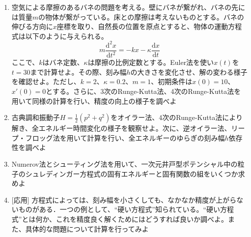 \documentclass[11pt]{jarticle}
\begin{document}
\noindent {\bf [常微分方程式]}
\begin{enumerate}

\renewcommand{\labelenumi}{2-\arabic{enumi})}
\item 空気による摩擦のあるバネの問題を考える。壁にバネが繋がれ、バネの先には質量$m$の物体が繋がっている。床との摩擦は考えないものとする。バネの伸びる方向に$x$座標を取り、自然長の位置を原点とすると、物体の運動方程式は以下のように与えられる。
  \[
  m\frac{\mathrm{d} ^2x}{\mathrm{d} t^2} = -kx - \kappa \frac{\mathrm{d} x}{\mathrm{d} t} 
  \]
  ここで、$k$はバネ定数、$\kappa$は摩擦の比例定数とする。Euler法を使い$x(t)$を$t=30$まで計算せよ。その際、刻み幅$h$の大きさを変化させ、解の変わる様子を確認せよ。ただし、$k=2$、$\kappa = 0.2$、$m = 1$、初期条件は$x(0) = 10$、$x'(0) = 0$とする。さらに、3次のRunge-Kutta法、4次のRunge-Kutta法を用いて同様の計算を行い、精度の向上の様子を調べよ

\item 古典調和振動子$H=\frac{1}{2}(p^2+q^2)$をオイラー法、4次のRunge-Kutta法により解き、全エネルギー時間変化の様子を観察せよ。次に、逆オイラー法、リープ・フロッグ法を用いて計算を行い、全エネルギーのゆらぎの刻み幅$h$依存性を調べよ

\item Numerov法とシューティング法を用いて、一次元井戸型ポテンシャル中の粒子のシュレディンガー方程式の固有エネルギーと固有関数の組をいくつか求めよ
  
\item \mbox{} [応用] 方程式によっては、刻み幅を小さくしても、なかなか精度が上がらないものがある．一つの例として、``硬い方程式''知られている。``硬い方程式''とは何か、これを精度良く解くためにはどうすれば良いか調べよ。また、具体的な問題について計算を行ってみよ

\end{enumerate}
\end{document}
